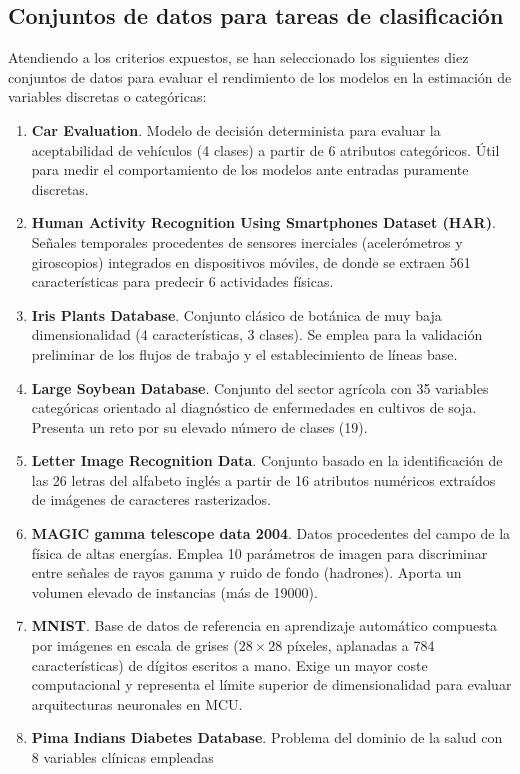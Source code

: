 \documentclass[a4paper,12pt,twoside,final]{book}
\begin{document}
\subsection{Conjuntos de datos para tareas de clasificación}
Atendiendo a los criterios expuestos, se han seleccionado los siguientes diez conjuntos de datos para evaluar el
rendimiento de los modelos en la estimación de variables discretas o categóricas:
\begin{enumerate}
  \item \textbf{Car Evaluation}. Modelo de decisión determinista para evaluar la aceptabilidad de vehículos (4
  clases) a partir de 6 atributos categóricos. Útil para medir el comportamiento de los modelos ante entradas
  puramente discretas.
  \item \textbf{Human Activity Recognition Using Smartphones Dataset (HAR)}. Señales temporales procedentes de
  sensores inerciales (acelerómetros y giroscopios) integrados en dispositivos móviles, de donde se extraen 561
  características para predecir 6 actividades físicas.
  \item \textbf{Iris Plants Database}. Conjunto clásico de botánica de muy baja dimensionalidad (4 características,
  3 clases). Se emplea para la validación preliminar de los flujos de trabajo y el establecimiento de líneas base.
  \item \textbf{Large Soybean Database}. Conjunto del sector agrícola con 35 variables categóricas orientado al
  diagnóstico de enfermedades en cultivos de soja. Presenta un reto por su elevado número de clases (19).
  \item \textbf{Letter Image Recognition Data}. Conjunto basado en la identificación de las 26 letras del alfabeto
  inglés a partir de 16 atributos numéricos extraídos de imágenes de caracteres rasterizados.
  \item \textbf{MAGIC gamma telescope data 2004}. Datos procedentes del campo de la física de altas energías. Emplea
  10 parámetros de imagen para discriminar entre señales de rayos gamma y ruido de fondo (hadrones). Aporta un
  volumen elevado de instancias (más de 19000).
  \item \textbf{MNIST}. Base de datos de referencia en aprendizaje automático compuesta por imágenes en escala de
  grises ($28\times 28$ píxeles, aplanadas a 784 características) de dígitos escritos a mano. Exige un mayor coste
  computacional y representa el límite superior de dimensionalidad para evaluar arquitecturas neuronales en MCU.
  \item \textbf{Pima Indians Diabetes Database}. Problema del dominio de la salud con 8 variables clínicas empleadas

\end{enumerate}
\end{document}
